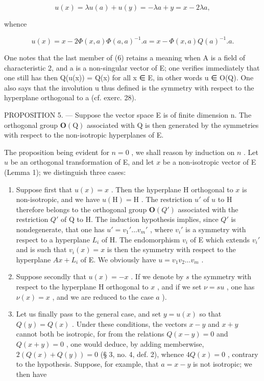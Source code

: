 \[
u (x) = \lambda u (a) + u (y) = - \lambda a + y = x - 2 \lambda a,
\]

whence

\[
u (x) = x - 2 \Phi (x, a) \Phi (a, a) ^ {- 1}. a = x - \Phi (x, a) Q (a) ^ {- 1}. a.\tag{6}
\]

One notes that the last member of (6) retains a meaning when A is a field of characteristic 2, and a is a non-singular vector of E; one verifies immediately that one still has then Q(u(x)) = Q(x) for all x ∈ E, in other words u ∈ O(Q). One also says that the involution u thus defined is the symmetry with respect to the hyperplane orthogonal to a (cf. exerc. 28).

PROPOSITION 5. --- Suppose the vector space E is of finite dimension n. The orthogonal group \(\mathbf{O}(\mathrm{Q})\) associated with Q is then generated by the symmetries with respect to the non-isotropic hyperplanes of E.

The proposition being evident for \(n=0\) , we shall reason by induction on \(n\) . Let \(u\) be an orthogonal transformation of E, and let \(x\) be a non-isotropic vector of E (Lemma 1); we distinguish three cases:

\begin{enumerate}
\def\labelenumi{\alph{enumi})}
\item
  Suppose first that \(u(x) = x\) . Then the hyperplane H orthogonal to \(x\) is non-isotropic, and we have \(u(\mathrm{H}) = \mathrm{H}\) . The restriction \(u'\) of \(u\) to H therefore belongs to the orthogonal group \(\mathbf{O}(Q')\) associated with the restriction \(Q'\) of Q to H. The induction hypothesis implies, since \(Q'\) is nondegenerate, that one has \(u' = v_1' \ldots v_m'\) , where \(v_i'\) is a symmetry with respect to a hyperplane \(L_i\) of H. The endomorphism \(v_i\) of E which extends \(v_i'\) and is such that \(v_i(x) = x\) is then the symmetry with respect to the hyperplane \(Ax + L_i\) of E. We obviously have \(u = v_1v_2 \ldots v_m\) .
\item
  Suppose secondly that \(u(x) = -x\) . If we denote by \(s\) the symmetry with respect to the hyperplane H orthogonal to \(x\) , and if we set \(\nu = su\) , one has \(\nu(x) = x\) , and we are reduced to the case \(a\) ).
\item
  Let us finally pass to the general case, and set \(y = u(x)\) so that \(Q(y) = Q(x)\) . Under these conditions, the vectors \(x - y\) and \(x + y\) cannot both be isotropic, for from the relations \(Q(x - y) = 0\) and \(Q(x + y) = 0\) , one would deduce, by adding memberwise, \(2(Q(x) + Q(y)) = 0\) (§ 3, no. 4, def. 2), whence \(4Q(x) = 0\) , contrary to the hypothesis. Suppose, for example, that \(a = x - y\) is not isotropic; we then have
\end{enumerate}


